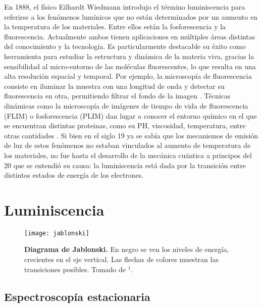 En 1888, el físico Eilhardt Wiedmann introdujo el término luminiscencia para referirse a los fenómenos lumínicos que no están determinados por un aumento en la temperatura de los materiales.
Entre ellos están la fosforescencia y la fluorescencia.
Actualmente ambos tienen aplicaciones en múltiples áreas distintas del conocimiento y la tecnología. 
Es particularmente destacable su éxito como herramienta para estudiar la estructura y dinámica de la materia viva, gracias la sensibilidad al micro-entorno de las moléculas fluorescentes, lo que resulta en una alta resolución espacial y temporal. 
Por ejemplo, la microscopía de fluorescencia consiste en iluminar la muestra con una longitud de onda y detectar su fluorescencia en otra, permitiendo filtrar el fondo de la imagen \cite{valeur_introduction_2012}.
Técnicas dinámicas como la microscopía de imágenes de tiempo de vida de fluorescencia (FLIM) o fosforescencia (PLIM) dan lugar a conocer el entorno químico en el que se encuentran distintas proteinas, como su PH, viscosidad, temperatura, entre otras cantidades \cite{suhling_fluorescence_2015} \cite{baggaley_timeresolved_2015}.
Si bien en el siglo 19 ya se sabía que los mecanismos de emisión de luz de estos fenómenos no estaban vinculados al aumento de temperatura de los materiales, no fue hasta el desarrollo de la mecánica cuántica a principos del 20 que se entendió su causa: la luminiscencia está dada por la transición entre distintos estados de energía de los electrones.

\section{Luminiscencia}


\begin{figure}
    \centering
    \texttt{[image: jablonski]}
    \caption{\textbf{Diagrama de Jablonski.} En negro se ven los niveles de energía, crecientes en el eje vertical. Las flechas de colores muestran las transiciones posibles. Tomado de $^1$.}
    \label{fig:jablonski}
\end{figure}

\subsection{Espectroscopía estacionaria}

